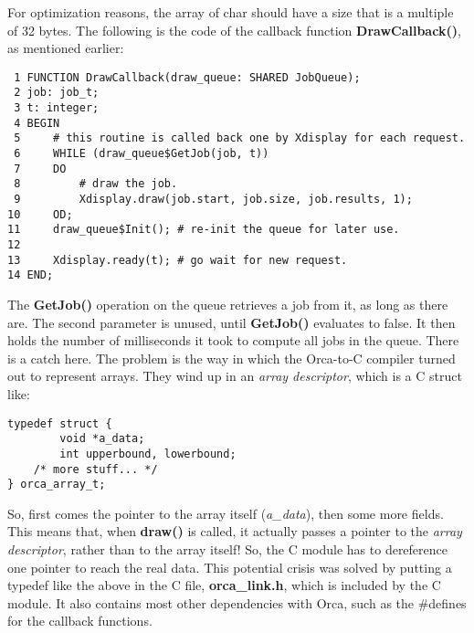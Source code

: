 For optimization reasons, the array of char should have a size that is a
multiple of 32 bytes.
\Skip
The following is the code of the callback function {\bf DrawCallback()}, as 
mentioned earlier: 
\begin{verbatim}
 1 FUNCTION DrawCallback(draw_queue: SHARED JobQueue);
 2 job: job_t;
 3 t: integer;
 4 BEGIN
 5     # this routine is called back one by Xdisplay for each request.
 6     WHILE (draw_queue$GetJob(job, t))
 7     DO
 8         # draw the job.
 9         Xdisplay.draw(job.start, job.size, job.results, 1);
10     OD;
11     draw_queue$Init(); # re-init the queue for later use.
12
13     Xdisplay.ready(t); # go wait for new request. 
14 END;
\end{verbatim}
The {\bf GetJob()} operation on the queue retrieves a job from it, as long
as there are. The second parameter is unused, until {\bf GetJob()} evaluates
to false. It then holds the number of milliseconds
it took to compute all jobs in the queue.
\Skip
There is a catch here. The problem is the way in which the Orca-to-C compiler
turned out to represent arrays. They wind up in an {\em array descriptor},
which is a C struct like:  
\begin{verbatim}
typedef struct {  
        void *a_data; 
        int upperbound, lowerbound; 
	/* more stuff... */
} orca_array_t;
\end{verbatim}
So, first comes the pointer to the array itself ({\em a\_data}), then some more
fields. This means that, when {\bf draw()} is called, it actually passes a
pointer to the {\em array descriptor}, rather than to the array itself!
So, the C module has to dereference one pointer to reach the real data.
\Skip
This potential crisis was solved by putting a typedef like the above in 
the C file, {\bf orca\_link.h}, which is included by the C module. 
It also contains most other dependencies with Orca, such as the \#defines
for the callback functions.




